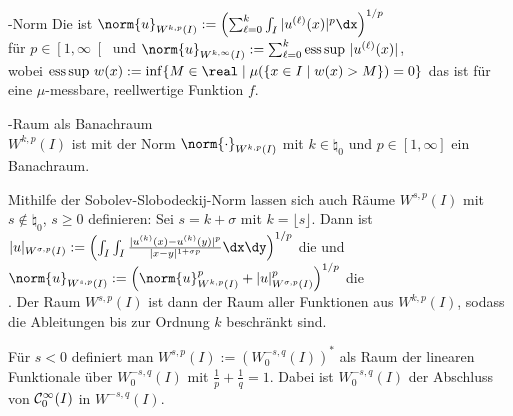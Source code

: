 \begin{Def}{-Norm}
    Die  ist
    $\norm{u}_{W^{k,p}(I)} :=
    \left(\sum_{\ell=0}^k \int_I |u^{(\ell)}(x)|^p\dx\right)^{1/p}$\\
    für $p \in \left[1, \infty\right[$ und
    $\norm{u}_{W^{k,\infty}(I)} :=
    \sum_{\ell=0}^k \esssup |u^{(\ell)}(x)|$,\\
    wobei $\esssup w(x) :=
    \inf \{M \in \real \;|\; \mu(\{x \in I \;|\; w(x) > M\}) = 0\}$
    das  ist
    für eine $\mu$-messbare, reell\-wertige Funktion $f$.
\end{Def}

\begin{Satz}{-Raum als Banachraum}\\
    $W^{k,p}(I)$ ist mit der Norm $\norm{\cdot}_{W^{k,p}(I)}$ mit
    $k \in \natural_0$ und $p \in [1, \infty]$ ein Banachraum.
\end{Satz}

\linie

\begin{Bem}
    Mithilfe der Sobolev-Slobodeckij-Norm
    lassen sich auch Räume $W^{s,p}(I)$ mit $s \notin \natural_0$, $s \ge 0$
    definieren:
    Sei $s = k + \sigma$ mit $k = \lfloor s \rfloor$.
    Dann ist
    $|u|_{W^{\sigma,p}(I)} := \left(\int_I \int_I
    \frac{|u^{(k)}(x) - u^{(k)}(y)|^p}
    {|x - y|^{1+\sigma p}} \dx\dy\right)^{1/p}$ die
     und
    $\norm{u}_{W^{s,p}(I)} := \left(\norm{u}_{W^{k,p}(I)}^p +
    |u|_{W^{\sigma,p}(I)}^p\right)^{1/p}$ die\\
    .
    Der Raum $W^{s,p}(I)$ ist dann der Raum aller Funktionen aus
    $W^{k,p}(I)$, sodass die Ableitungen bis zur Ordnung $k$ beschränkt sind.
\end{Bem}

\begin{Bem}
    Für $s < 0$ definiert man
    $W^{s,p}(I) := (W^{-s,q}_0(I))^\ast$ als Raum der linearen Funktionale
    über $W^{-s,q}_0(I)$ mit $\frac{1}{p} + \frac{1}{q} = 1$.
    Dabei ist $W^{-s,q}_0(I)$ der Abschluss von $\mathcal{C}_0^\infty(I)$ in
    $W^{-s,q}(I)$.
\end{Bem}

